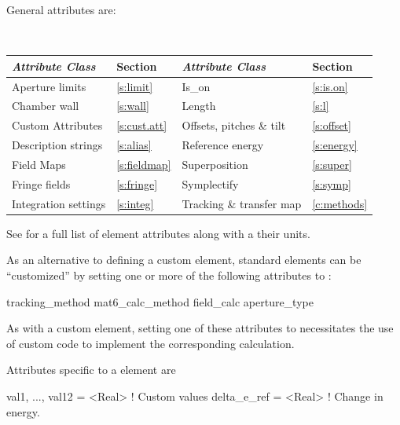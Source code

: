 General  attributes are:
\begin{center}
\tt
\begin{tabular}{llll} \toprule
  {\sl Attribute Class}      & Section           & {\sl Attribute Class}      & Section         \\ \midrule
  Aperture limits            & \ref{s:limit}     & Is_on                      & \ref{s:is.on}   \\
  Chamber wall               & \ref{s:wall}      & Length                     & \ref{s:l}       \\
  Custom Attributes          & \ref{s:cust.att}  & Offsets, pitches \& tilt   & \ref{s:offset}  \\
  Description strings        & \ref{s:alias}     & Reference energy           & \ref{s:energy}  \\ 
  Field Maps                 & \ref{s:fieldmap}  & Superposition              & \ref{s:super}   \\
  Fringe fields              & \ref{s:fringe}    & Symplectify                & \ref{s:symp}    \\
  Integration settings       & \ref{s:integ}     & Tracking \& transfer map   & \ref{c:methods} \\ 
  \bottomrule
\end{tabular}
\end{center}
\toffset
See  for a full list of element attributes along with a their units.

As an alternative to defining a custom element, standard elements can
be ``customized'' by setting one or more of the following attributes
to :
\begin{example}
  tracking_method       
  mat6_calc_method      
  field_calc            
  aperture_type         
\end{example}

As with a custom element, setting one of these attributes to
 necessitates the use of custom code to implement the
corresponding calculation.

Attributes specific to a  element are
\begin{example}
  val1, ..., val12 = <Real>  ! Custom values 
  delta_e_ref      = <Real>  ! Change in energy.
\end{example}


